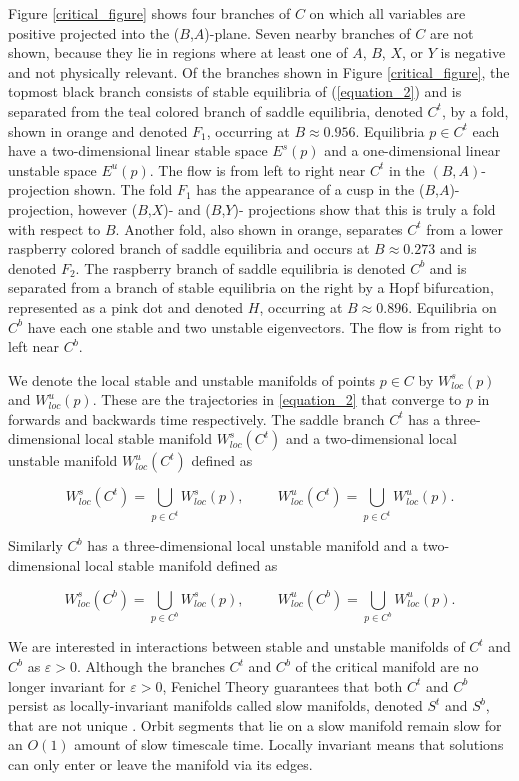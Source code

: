 \documentclass{ws-ijbc}
\begin{document}
Figure \ref{critical_figure} shows four branches of $C$ on which all variables are positive projected into the ($B$,$A$)-plane.  Seven nearby branches of $C$ are not shown, because they lie in regions where at least one of $A$, $B$, $X$, or $Y$ is negative and not physically relevant.  Of the branches shown in Figure \ref{critical_figure}, the topmost black branch consists of stable equilibria of (\ref{equation_2}) and is separated from the teal colored branch of saddle equilibria, denoted $C^t$, by a fold, shown in orange and denoted $F_1$, occurring at $B \approx 0.956$.  Equilibria $p \in C^t$ each have a two-dimensional linear stable space $E^s(p)$ and a one-dimensional linear unstable space $E^u(p)$.  The flow is from left to right near $C^t$ in the $(B,A)$-projection shown.  The fold $F_1$ has the appearance of a cusp in the ($B$,$A$)-projection, however ($B$,$X$)- and ($B$,$Y$)- projections show that this is truly a fold with respect to $B$.  Another fold, also shown in orange, separates $C^t$ from a lower raspberry colored branch of saddle equilibria and occurs at $B \approx 0.273$ and is denoted $F_2$.  The raspberry branch of saddle equilibria is denoted $C^b$ and is separated from a branch of stable equilibria on the right by a Hopf bifurcation, represented as a pink dot and denoted $H$, occurring at $B \approx 0.896$.  Equilibria on $C^b$ have each one stable and two unstable eigenvectors.  The flow is from right to left near $C^b$.
    
We denote the local stable and unstable manifolds of points $p \in C$ by $W^{s}_{loc}(p)$ and $W^{u}_{loc}(p)$.  These are the trajectories in \ref{equation_2} that converge to $p$ in forwards and backwards time respectively.  The saddle branch $C^t$ has a three-dimensional local stable manifold $W^{s}_{loc}(C^t)$ and a two-dimensional local unstable manifold $W^{u}_{loc}(C^t)$ defined as
    
$$W^{s}_{loc}(C^t) = \bigcup_{p \in C^t} W^{s}_{loc}(p), \hspace{1cm} W^{u}_{loc}(C^t) = \bigcup_{p \in C^t} W^{u}_{loc}(p).$$
    
\noindent
Similarly $C^b$ has a three-dimensional local unstable manifold and a two-dimensional local stable manifold defined as
    
$$W^{s}_{loc}(C^b) = \bigcup_{p \in C^b} W^{s}_{loc}(p), \hspace{1cm} W^{u}_{loc}(C^b) = \bigcup_{p \in C^b} W^{u}_{loc}(p).$$
    
We are interested in interactions between stable and unstable manifolds of $C^t$ and $C^b$ as $\varepsilon > 0$.  Although the branches $C^t$ and $C^b$ of the critical manifold are no longer invariant for $\varepsilon > 0$, Fenichel Theory guarantees that both $C^t$ and $C^b$ persist as locally-invariant manifolds called slow manifolds, denoted $S^t$ and $S^b$, that are not unique \cite{Fenichel}. Orbit segments that lie on a slow manifold remain slow for an $O(1)$ amount of slow timescale time.  Locally invariant means that solutions can only enter or leave the manifold via its edges.  
    
\end{document}

